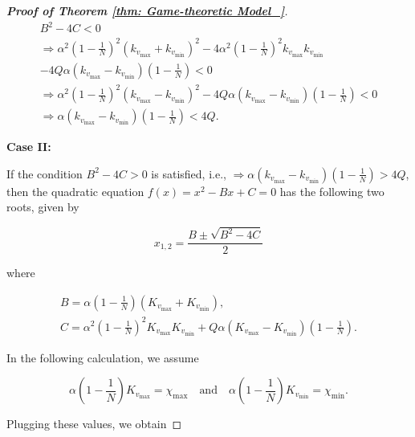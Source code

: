\documentclass{article}
\theoremstyle{remark}
\theoremstyle{custom} %
\begin{document}
\begin{proof}[\textbf{Proof of Theorem \ref{thm: Game-theoretic Model_}}]
$$
\begin{gathered} 
B^2-4 C<0 \\
\Rightarrow \alpha^2\left(1-\frac{1}{N}\right)^2\left(k_{v_{\max }}+k_{v_{\min }}\right)^2-4 \alpha^2\left(1-\frac{1}{N}\right)^2 k_{v_{\max }} k_{v_{\min }} \\
-4 Q\alpha\left(k_{v_{\max }}-k_{v_{\min }}\right)\left(1-\frac{1}{N}\right)<0 \\
\Rightarrow \alpha^2\left(1-\frac{1}{N}\right)^2\left(k_{v_{\max }}-k_{v_{\min }}\right)^2-4 Q\alpha\left(k_{v_{\max }}-k_{v_{\min }}\right)\left(1-\frac{1}{N}\right)<0 \\
\Rightarrow \alpha\left(k_{v_{\max }}-k_{v_{\min }}\right)\left(1-\frac{1}{N}\right)<4Q.
\end{gathered}
$$


\textbf{Case II:}

If the condition $B^2-4 C>0$ is satisfied, i.e., $\Rightarrow \alpha\left(k_{v_{\max }}-k_{v_{\min }}\right)\left(1-\frac{1}{N}\right)>4 Q$, then the quadratic equation $f(x)=x^2-B x+C=0$ has the following two roots, given by

$$
x_{1,2}=\frac{B \pm \sqrt{B^2-4 C}}{2}
$$

where

$$
\begin{gathered}
B=\alpha\left(1-\frac{1}{N}\right)\left(K_{v_{\max }}+K_{v_{\min }}\right), \\
C=\alpha^2\left(1-\frac{1}{N}\right)^2 K_{v_{\max }} K_{v_{\min }}+Q \alpha\left(K_{v_{\max }}-K_{v_{\min }}\right)\left(1-\frac{1}{N}\right) .
\end{gathered}
$$

In the following calculation, we assume

$$
\alpha\left(1-\frac{1}{N}\right) K_{v_{\max }}=\chi_{\max} \quad\text {and} \quad \alpha\left(1-\frac{1}{N}\right) K_{v_{\min }}=\chi_{\min}.
$$


Plugging these values, we obtain


\end{proof}
\end{document}

